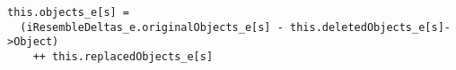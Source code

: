 \lstset{frame=tb, aboveskip=12pt, belowskip=-3pt, breaklines=true, basicstyle=\small\ttfamily, tabsize=2, mathescape=true}
\begin{lstlisting}[caption={base\_deltas.als, lines 157-159}, label=alloy:objects_e, captionpos=b]
this.objects_e[s] = 
  (iResembleDeltas_e.originalObjects_e[s] - this.deletedObjects_e[s]->Object)
    ++ this.replacedObjects_e[s]
\end{lstlisting}
